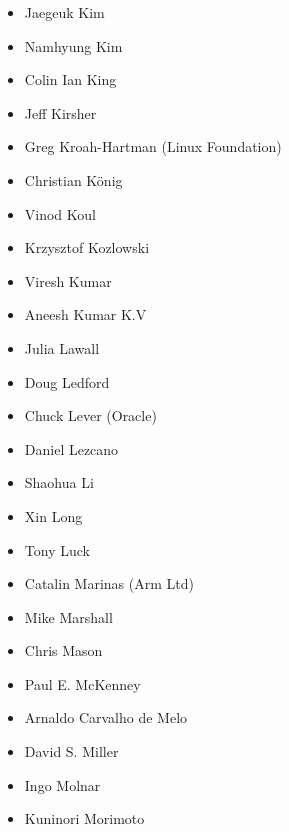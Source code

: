 \documentclass[a4paper,8pt,english]{sphinxmanual}
\begin{document}
\begin{itemize}
\item {} 
Jaegeuk Kim

\item {} 
Namhyung Kim

\item {} 
Colin Ian King

\item {} 
Jeff Kirsher

\item {} 
Greg Kroah-Hartman (Linux Foundation)

\item {} 
Christian König

\item {} 
Vinod Koul

\item {} 
Krzysztof Kozlowski

\item {} 
Viresh Kumar

\item {} 
Aneesh Kumar K.V

\item {} 
Julia Lawall

\item {} 
Doug Ledford

\item {} 
Chuck Lever (Oracle)

\item {} 
Daniel Lezcano

\item {} 
Shaohua Li

\item {} 
Xin Long

\item {} 
Tony Luck

\item {} 
Catalin Marinas (Arm Ltd)

\item {} 
Mike Marshall

\item {} 
Chris Mason

\item {} 
Paul E. McKenney

\item {} 
Arnaldo Carvalho de Melo

\item {} 
David S. Miller

\item {} 
Ingo Molnar

\item {} 
Kuninori Morimoto


\end{itemize}
\end{document}
